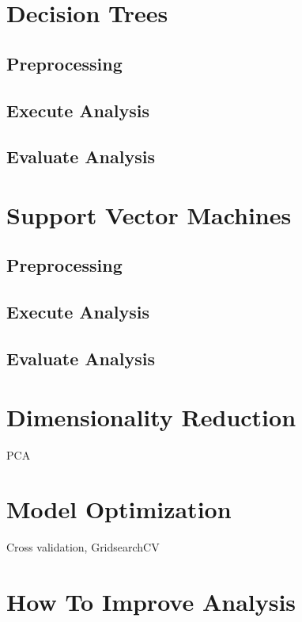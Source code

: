 \documentclass[sigconf]{acmart}
\begin{document}
\section{Decision Trees}

\subsection{Preprocessing}

\subsection{Execute Analysis}

\subsection{Evaluate Analysis}


\section{Support Vector Machines}

\subsection{Preprocessing}

\subsection{Execute Analysis}

\subsection{Evaluate Analysis}



\section{Dimensionality Reduction}

PCA

\section{Model Optimization}

Cross validation, GridsearchCV

\section{How To Improve Analysis}
\end{document}

